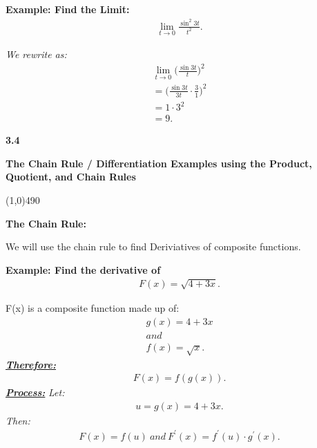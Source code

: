 \documentclass{report}
\begin{document}
  \bigbreak \noindent 
  \begin{mdframed}
    \textbf{Example: Find the Limit:}
    \begin{align*}
      \lim_{t \to 0}{ \frac{ \sin^2{3t}}{t^2}}
    .\end{align*}
  \end{mdframed}
  \textit{We rewrite as:}
  \begin{align*}
    \lim_{t \to 0}{ \bigg( \frac{ \sin{3t}}{t}\bigg)^2} \\
    = \bigg( \frac{ \sin{3t}}{3t} \cdot \frac{3}{1}\bigg)^2 \\
    = 1 \cdot 3^2 \\ 
    = 9
  .\end{align*}
  
  \pagebreak \bigbreak \noindent
  \begin{Large}
      \begin{mdframed}
          \begin{center}
              \textbf{3.4}
          \end{center}
      \end{mdframed}
  \end{Large}
  \begin{Large}
      \begin{center}
        \textbf{The Chain Rule / Differentiation Examples using the Product, Quotient, and Chain Rules}
      \end{center}
  \end{Large}
  \line(1,0){490}

  \bigbreak \noindent \bigbreak \noindent 
  \begin{Large}
    \textbf{The Chain Rule:}
  \end{Large}
  \bigbreak \noindent 
  We will use the chain rule to find Deriviatives of composite functions.

  \bigbreak \noindent 
  \begin{mdframed}
    \textbf{Example: Find the derivative of }
    \begin{align*}
      F(x) = \sqrt{4+3x}
    .\end{align*}
  \end{mdframed}
  \bigbreak \noindent 
  F(x) is a composite function made up of:
  \begin{align*}
    g(x) = 4 +3x \\
    and \\
    f(x) = \sqrt{x}
  .\end{align*}
  \bigbreak \noindent 
  \textbf{\textit{\underline{Therefore:}}}
  \begin{align*}
    F(x) = f(g(x))
  .\end{align*}
  \bigbreak \noindent 
  \textbf{\textit{\underline{Process:}}} 
  \bigbreak \noindent 
  \textit{Let:}
  \begin{align*}
    u = g(x) = 4+3x
  .\end{align*}
  \bigbreak \noindent 
  \textit{Then:}
  \begin{align*}
    F(x) = f(u)\ and\ F^{\prime}(x) = f^{\prime}(u) \cdot g^{\prime}(x)
  .\end{align*}
\end{document}
